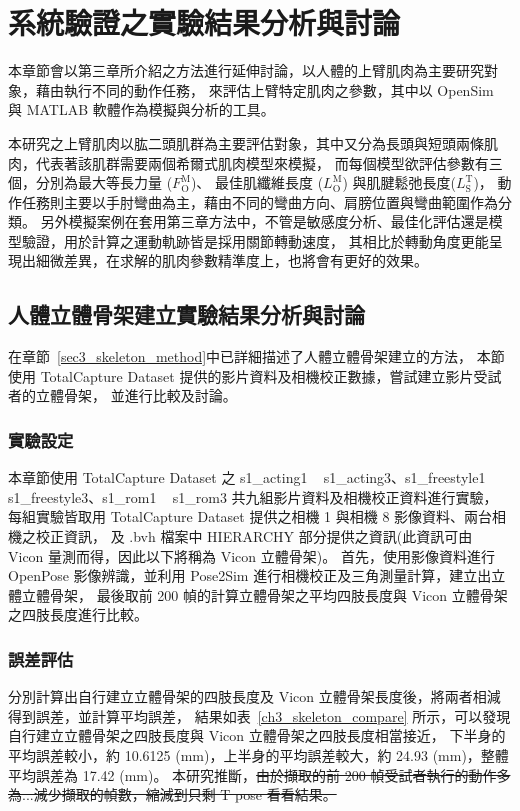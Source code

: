 \chapter{系統驗證之實驗結果分析與討論}
\fontsize{12pt}{18pt}\selectfont %

本章節會以第三章所介紹之方法進行延伸討論，以人體的上臂肌肉為主要研究對象，藉由執行不同的動作任務，
來評估上臂特定肌肉之參數，其中以 OpenSim 與 MATLAB 軟體作為模擬與分析的工具。

本研究之上臂肌肉以肱二頭肌群為主要評估對象，其中又分為長頭與短頭兩條肌肉，代表著該肌群需要兩個希爾式肌肉模型來模擬，
而每個模型欲評估參數有三個，分別為最大等長力量 ($F^\mathrm{M}_\mathrm{O}$)、
最佳肌纖維長度 ($L^\mathrm{M}_\mathrm{O}$) 與肌腱鬆弛長度($L^\mathrm{T}_\mathrm{S}$)，
動作任務則主要以手肘彎曲為主，藉由不同的彎曲方向、肩膀位置與彎曲範圍作為分類。
另外模擬案例在套用第三章方法中，不管是敏感度分析、最佳化評估還是模型驗證，用於計算之運動軌跡皆是採用關節轉動速度，
其相比於轉動角度更能呈現出細微差異，在求解的肌肉參數精準度上，也將會有更好的效果。

\section{人體立體骨架建立實驗結果分析與討論}\label{sec4_skeleton_exp}
在章節~\ref{sec3_skeleton_method}中已詳細描述了人體立體骨架建立的方法，
本節使用 TotalCapture Dataset 提供的影片資料及相機校正數據，嘗試建立影片受試者的立體骨架，
並進行比較及討論。

\subsection{實驗設定}
本章節使用 TotalCapture Dataset 之 s1\_acting1 ~ s1\_acting3、s1\_freestyle1 ~ s1\_freestyle3、s1\_rom1 ~ s1\_rom3 共九組影片資料及相機校正資料進行實驗，
每組實驗皆取用 TotalCapture Dataset 提供之相機 1 與相機 8 影像資料、兩台相機之校正資訊，
及 .bvh 檔案中 HIERARCHY 部分提供之資訊(此資訊可由 Vicon 量測而得，因此以下將稱為 Vicon 立體骨架)。
首先，使用影像資料進行 OpenPose 影像辨識，並利用 Pose2Sim 進行相機校正及三角測量計算，建立出立體立體骨架，
最後取前 200 幀的計算立體骨架之平均四肢長度與 Vicon 立體骨架之四肢長度進行比較。

\subsection{誤差評估}
分別計算出自行建立立體骨架的四肢長度及 Vicon 立體骨架長度後，將兩者相減得到誤差，並計算平均誤差，
結果如表~\ref{ch3_skeleton_compare} 所示，可以發現自行建立立體骨架之四肢長度與 Vicon 立體骨架之四肢長度相當接近，
下半身的平均誤差較小，約 10.6125 (mm)，上半身的平均誤差較大，約 24.93 (mm)，整體平均誤差為 17.42 (mm)。
本研究推斷，\sout{由於擷取的前 200 幀受試者執行的動作多為...減少擷取的幀數，縮減到只剩 T pose 看看結果。}

